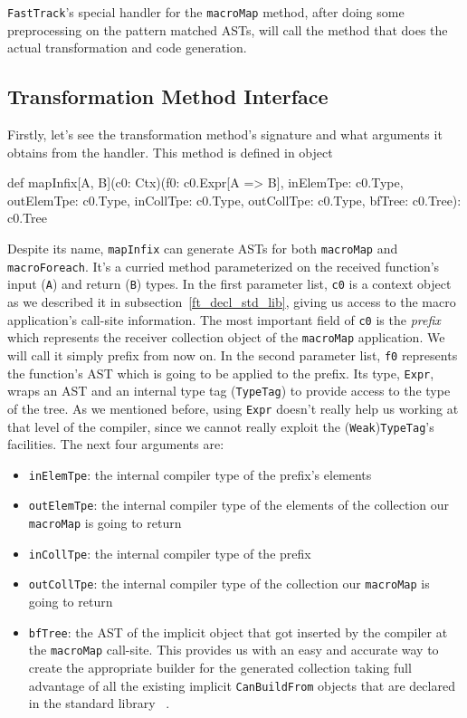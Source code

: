 \texttt{FastTrack}'s special handler for the \texttt{macroMap} method, after
doing some preprocessing on the pattern matched ASTs, will call the method
that does the actual transformation and code generation. 


\subsection{Transformation Method Interface}

Firstly, let's see the transformation method's signature and what arguments it
obtains from the handler. This method is defined in
 object 

\begin{scalaCode}
def mapInfix[A, B](c0: Ctx)(f0: c0.Expr[A => B], inElemTpe: c0.Type, outElemTpe: c0.Type, inCollTpe: c0.Type, outCollTpe: c0.Type, bfTree: c0.Tree): c0.Tree
\end{scalaCode}

Despite its name,
\texttt{mapInfix} can generate ASTs for both \texttt{macroMap} and \texttt{macroForeach}. It's a curried
method parameterized on the received function's input (\texttt{A}) and return (\texttt{B}) types.
In the first parameter list, \texttt{c0} is a context object as we described it in subsection~\ref{ft_decl_std_lib},
giving us access to the macro application's call-site information. The most
important field of \texttt{c0} is the \emph{prefix} which represents the receiver collection
object of the \texttt{macroMap} application. We will call it simply prefix
from now on. In the second parameter
list, \texttt{f0} represents the function's AST which is going to be applied to the
prefix. Its type, \texttt{Expr}, wraps an AST and an internal type tag
(\texttt{TypeTag}) to provide access to the type of the tree. As we mentioned
before, using \texttt{Expr} doesn't really help us working at that level of the
compiler, since we cannot really exploit the (\texttt{Weak})\texttt{TypeTag}'s facilities. The
next four arguments are:
\begin{itemize}
 \item
  \texttt{inElemTpe}: the internal compiler type of the prefix's elements
 \item
  \texttt{outElemTpe}: the internal compiler type of the elements of the collection our
\texttt{macroMap} is going to return
 \item
  \texttt{inCollTpe}: the internal compiler type of the prefix
 \item
  \texttt{outCollTpe}: the internal compiler type of the collection our \texttt{macroMap} is going
to return
 \item
  \texttt{bfTree}: the AST of the implicit  object that got
inserted by the compiler at the \texttt{macroMap} call-site. This provides us with an
easy and accurate way to create the appropriate builder for the generated
collection taking full advantage of all the existing implicit \texttt{CanBuildFrom} objects
that are declared in the standard library~\cite{moors2009type} .
\end{itemize}

